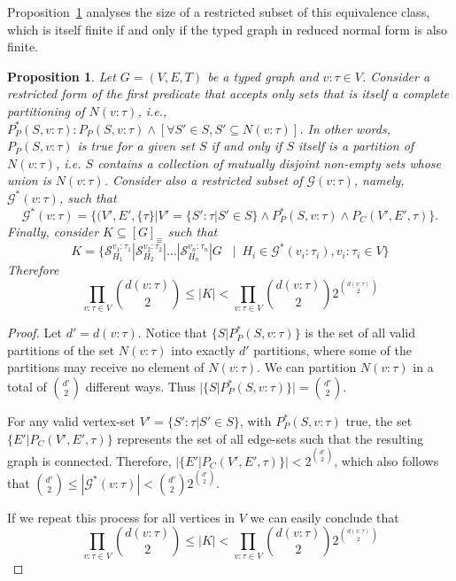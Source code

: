 \documentclass[preprint,12pt]{elsarticle}
\theoremstyle{plain}
\newtheorem{prop}[theorem]{Proposition}
\newcommand\tyv[2]{#1\!\!:\!\!#2}
\begin{document}
Proposition~\ref{prop:sizereducedclass}
analyses the size of a restricted subset of this equivalence class,
which is itself finite if and only if the typed graph in reduced normal form is
also finite.

\begin{prop}\label{prop:sizereducedclass}
Let $G = (V,E,T)$ be a typed graph and $\tyv{v}{\tau}\in V$.
Consider a restricted form of the first predicate that accepts
only sets that is itself a complete partitioning of $N(\tyv{v}{\tau})$, i.e.,
$P_P^*(S, \tyv{v}{\tau}): P_P(S, \tyv{v}{\tau}) \wedge [\forall S'\in S, S'\subseteq N(\tyv{v}{\tau})]$.
In other words,
$P_P(S, \tyv{v}{\tau})$ is true for a given set $S$
if and only if
$S$ itself is a partition of $N(\tyv{v}{\tau})$,
i.e. $S$ contains 
a collection of mutually disjoint non-empty sets whose union is $N(\tyv{v}{\tau})$.
Consider also a restricted subset of $\mathcal{G}(\tyv{v}{\tau})$, namely, $\mathcal{G}^*(\tyv{v}{\tau})$, such that
\[
\mathcal{G}^*(\tyv{v}{\tau}) = \{(V',E',\{\tau\}|
    V'=\{\tyv{S'}{\tau}|S'\in S\}\wedge P_P^*(S, \tyv{v}{\tau}) \wedge P_C(V',E',\tau)\}.
\]
Finally, consider $K \subseteq [G]_\equiv$ such that
\[
K = \{ \mathcal{S}^{{v_1}:{\tau_1}}_{H_1}|\mathcal{S}^{{v_2}:{\tau_2}}_{H_2}|\dots|\mathcal{S}^{{v_n}:{\tau_n}}_{H_n}|G
             \,\,\,\,\,|\,\,\,   H_i\in\mathcal{G}^*(\tyv{v_i}{\tau_i}),\tyv{v_i}{\tau_i}\in V\}
\]
Therefore
\[
\prod_{v:\tau\in V} \binom{d(\tyv{v}{\tau})}{2} \leq |K| < \prod_{v:\tau\in V} \binom{d(\tyv{v}{\tau})}{2}2^{\binom{d(v:\tau)}{2}}
\]
\end{prop}
\begin{proof}
Let $d' = d(\tyv{v}{\tau})$.
Notice that $\{S|P_P^*(S, \tyv{v}{\tau})\}$
is the set of all
valid partitions of the set $N(\tyv{v}{\tau})$
into exactly $d'$ partitions, where some of the partitions may receive no
element of $N(\tyv{v}{\tau})$. We can partition $N(\tyv{v}{\tau})$
in a total of $\binom{d'}{2}$ different ways. Thus $|\{S|P_P^*(S, \tyv{v}{\tau})\}| = \binom{d'}{2}$.

For any valid vertex-set $V'=\{\tyv{S'}{\tau}|S'\in S\}$, with $P_P^*(S, \tyv{v}{\tau})$ true,
the set $\{E'| P_C(V',E',\tau)\}$ represents the set of all edge-sets such that the resulting graph is connected.
Therefore, $|\{E'| P_C(V',E',\tau)\}| < 2^{\binom{d'}{2}}$,
which also follows that $\binom{d'}{2} \leq |\mathcal{G}^*(\tyv{v}{\tau})| < \binom{d'}{2}2^{\binom{d'}{2}}$.

If we repeat this process for all vertices in $V$
we can easily conclude that
\[
\prod_{v:\tau\in V} \binom{d(\tyv{v}{\tau})}{2} \leq |K| < \prod_{v:\tau\in V} \binom{d(\tyv{v}{\tau})}{2}2^{\binom{d(v:\tau)}{2}}
\]
\end{proof}
\end{document}
